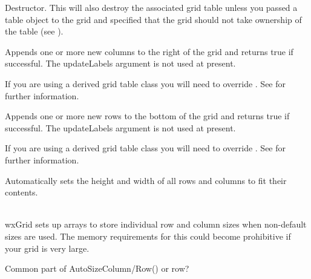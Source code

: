 Destructor. This will also destroy the associated grid table unless you passed a table
object to the grid and specified that the grid should not take ownership of the
table (see ).



\label{wxgridappendcols}


Appends one or more new columns to the right of the grid and returns true if
successful. The updateLabels argument is not used at present.

If you are using a derived grid table class you will need to override
. See
 for further information.



\label{wxgridappendrows}


Appends one or more new rows to the bottom of the grid and returns true if
successful. The updateLabels argument is not used at present.

If you are using a derived grid table class you will need to override
. See
 for further information.



\label{wxgridautosize}


Automatically sets the height and width of all rows and columns to fit their contents.

\\
wxGrid sets up arrays to store individual row and column sizes when non-default sizes are used.
The memory requirements for this could become prohibitive if your grid is very large.



\label{wxgridautosizecolorrow}


Common part of AutoSizeColumn/Row() or row?



